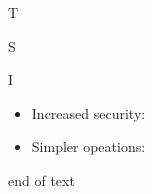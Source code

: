 %

T

S

I\begin{itemize}
  \item Increased security: 
  \item Simpler opeations: 
\end{itemize}

end of text
